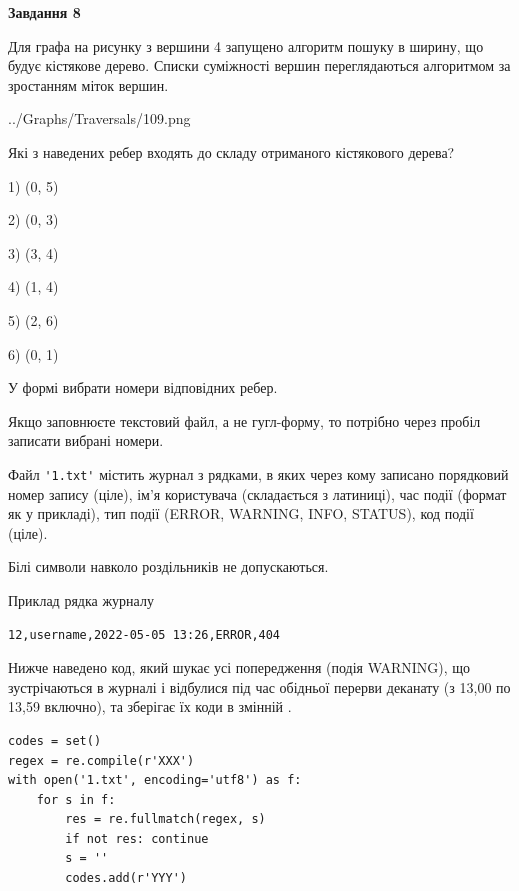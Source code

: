 \documentclass[12pt, ukrainian]{article}
\def\code#1{\Verb!#1!}
\begin{document}
{\begin {large}
{\begin {center}\textbf{Завдання 8}\end {center}}\par
Для графа на рисунку з вершини 4 запущено алгоритм пошуку в ширину, що будує кістякове дерево. Списки суміжності вершин переглядаються алгоритмом за зростанням міток вершин.\par
\begin{center}
	{../Graphs/Traversals/109.png}
\end{center}
\par Які з наведених ребер входять до складу отриманого кістякового дерева?\par
1) (0, 5)\par
2) (0, 3)\par
3) (3, 4)\par
4) (1, 4)\par
5) (2, 6)\par
6) (0, 1)\par
{\vskip 15pt} У формі вибрати номери відповідних ребер.


Якщо заповнюєте текстовий файл, а не гугл-форму, то потрібно через пробіл записа\-ти вибрані номери.\par
\newpage


Файл \code{'1.txt'} містить журнал з рядками, в яких через кому записано поряд\-ко\-вий номер запису (ціле), ім'я користувача (складається з латиниці), час події (фор\-мат як у прикладі), тип події (ERROR, WARNING, INFO, STATUS), код події (ціле).

Білі символи навколо роздільників не допускаються.

Приклад рядка журналу



\begin{verbatim}
12,username,2022-05-05 13:26,ERROR,404
\end{verbatim}


Нижче наведено код, який шукає усі попередження (подія WARNING), що зустрі\-ча\-ються в журналі і відбулися під час обідньої перерви деканату (з 13,00 по 13,59 включно), та зберігає їх коди в змінній .



\begin{verbatim}
codes = set()
regex = re.compile(r'XXX')
with open('1.txt', encoding='utf8') as f:
    for s in f:
        res = re.fullmatch(regex, s)
        if not res: continue
        s = ''
        codes.add(r'YYY')
\end{verbatim}





\end{large}}
\end{document}
